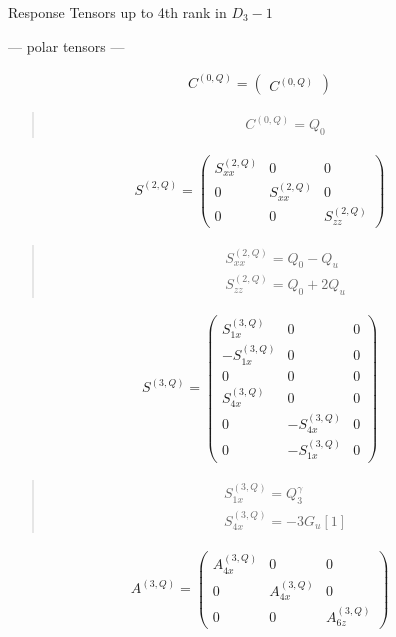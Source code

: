\documentclass[fleqn,10pt]{jsarticle}
\begin{document}
\setcounter{MaxMatrixCols}{16}

\begin{center}
\LARGE
Response Tensors up to 4th rank in $D_{3}-1$
\end{center}
\begin{center}\LARGE --- polar tensors ---\end{center}
\begin{align*}
C^{(0,Q)} = \begin{pmatrix} C^{(0,Q)} \end{pmatrix}
\end{align*}
\begin{quote}
\begin{align*}
& C^{(0,Q)} = Q_{0}
\end{align*}
\end{quote}
\begin{align*}
S^{(2,Q)} = \begin{pmatrix} S^{(2,Q)}_{xx} & 0 & 0 \\ 0 & S^{(2,Q)}_{xx} & 0 \\ 0 & 0 & S^{(2,Q)}_{zz} \end{pmatrix}
\end{align*}
\begin{quote}
\begin{align*}
& S^{(2,Q)}_{xx} = Q_{0} - Q_{u} \\
& S^{(2,Q)}_{zz} = Q_{0} + 2 Q_{u}
\end{align*}
\end{quote}
\begin{align*}
S^{(3,Q)} = \begin{pmatrix} S^{(3,Q)}_{1x} & 0 & 0 \\ - S^{(3,Q)}_{1x} & 0 & 0 \\ 0 & 0 & 0 \\ S^{(3,Q)}_{4x} & 0 & 0 \\ 0 & - S^{(3,Q)}_{4x} & 0 \\ 0 & - S^{(3,Q)}_{1x} & 0 \end{pmatrix}
\end{align*}
\begin{quote}
\begin{align*}
& S^{(3,Q)}_{1x} = Q_{3}^{\gamma} \\
& S^{(3,Q)}_{4x} = - 3 G_{u}[1]
\end{align*}
\end{quote}
\begin{align*}
A^{(3,Q)} = \begin{pmatrix} A^{(3,Q)}_{4x} & 0 & 0 \\ 0 & A^{(3,Q)}_{4x} & 0 \\ 0 & 0 & A^{(3,Q)}_{6z} \end{pmatrix}
\end{align*}
\end{document}
